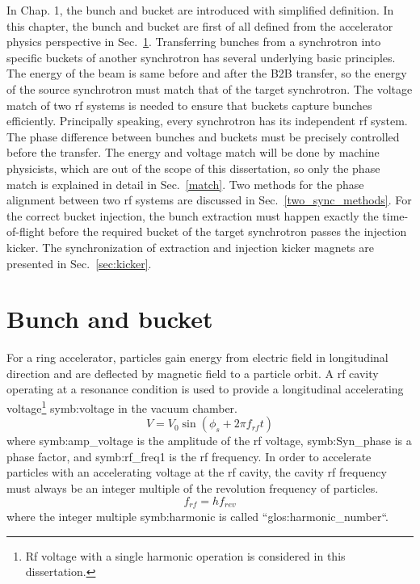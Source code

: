 In Chap. 1, the bunch and bucket are introduced with simplified definition. In this chapter, the bunch and bucket are first of all defined from the accelerator physics perspective in Sec.~\ref{bunch and bucket}. Transferring bunches from a synchrotron into specific buckets of another synchrotron has several underlying basic principles. The energy of the beam is same before and after the B2B transfer, so the energy of the source synchrotron must match that of the target synchrotron. The voltage match of two rf systems is needed to ensure that buckets capture bunches efficiently. Principally speaking, every synchrotron has its independent rf system. The phase difference between bunches and buckets must be precisely controlled before the transfer. The energy and voltage match will be done by machine physicists, which are out of the scope of this dissertation, so only the phase match is explained in detail in Sec.~\ref{match}. Two methods for the phase alignment between two rf systems are discussed in Sec.~\ref{two_sync_methods}. For the correct bucket injection, the bunch extraction must happen exactly the time-of-flight before the required bucket of the target synchrotron passes the injection kicker. The synchronization of extraction and injection kicker magnets are presented in Sec.~\ref{sec:kicker}.

\section{Bunch and bucket}
\label{bunch and bucket}
For a ring accelerator, particles gain energy from electric field in longitudinal direction and are deflected by magnetic field to a particle orbit. A rf cavity operating at a resonance condition is used to provide a longitudinal accelerating voltage\footnote{Rf voltage with a single harmonic operation is considered in this dissertation.} \gls{symb:voltage} in the vacuum chamber.
\begin{equation}
V=V_0\sin(\phi_\mathit{s}+2\pi f_\mathit{rf}t)
\end{equation}
where \gls{symb:amp_voltage} is the amplitude of the rf voltage, \gls{symb:Syn_phase} is a phase factor, and \gls{symb:rf_freq1} is the rf frequency. In order to accelerate particles with an accelerating voltage at the rf cavity, the cavity rf frequency must always be an integer multiple of the revolution frequency of particles. 
\begin{equation}
	f_{\mathit{rf}}=hf_{\mathit{rev}}\label{harmonic_number}
\end{equation}
where the integer multiple \gls{symb:harmonic} is called ``\gls{glos:harmonic_number}``. 

